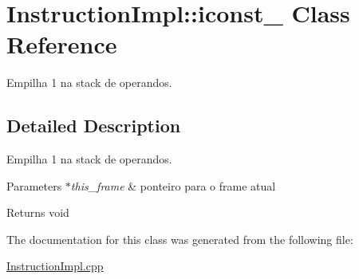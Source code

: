 \hypertarget{class_instruction_impl_1_1iconst__1}{}\section{Instruction\+Impl\+:\+:iconst\+\_ Class Reference}
\label{class_instruction_impl_1_1iconst__1}


Empilha 1 na stack de operandos.  




\subsection{Detailed Description}
Empilha 1 na stack de operandos. 


\begin{DoxyParams}{Parameters}
{\em $\ast$this\+\_\+frame} & ponteiro para o frame atual \\
\hline
\end{DoxyParams}
\begin{DoxyReturn}{Returns}
void 
\end{DoxyReturn}


The documentation for this class was generated from the following file\+:\begin{DoxyCompactItemize}
\item 
\hyperlink{_instruction_impl_8cpp}{Instruction\+Impl.\+cpp}\end{DoxyCompactItemize}
